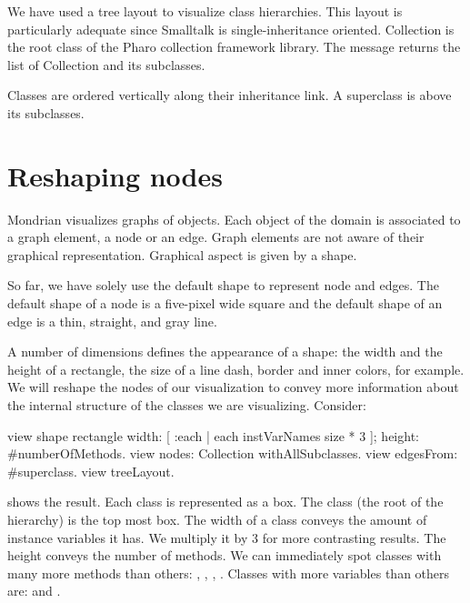 \documentclass[a4paper,10pt,twoside]{book}
\begin{document}
We have used a tree layout to visualize class hierarchies. This layout is particularly adequate since Smalltalk is single-inheritance oriented. Collection is the root class of the Pharo collection framework library. The message  returns the list of Collection and its subclasses.

Classes are ordered vertically along their inheritance link. A superclass is above its subclasses. 


\section{Reshaping nodes}

Mondrian visualizes graphs of objects. Each object of the domain is associated to a graph element, a node or an edge. Graph elements are not aware of their graphical representation. Graphical aspect is given by a shape. 

So far, we have solely use the default shape to represent node and edges. The default shape of a node is a five-pixel wide square and the default shape of an edge is a thin, straight, and gray line.

A number of dimensions defines the appearance of a shape: the width and the height of a rectangle, the size of a line dash, border and inner colors, for example. We will reshape the nodes of our visualization to convey more information about the internal structure of the classes we are visualizing. Consider:

\begin{code}{}
view shape rectangle
	width: [ :each | each instVarNames size * 3 ];
	height: #numberOfMethods.
view nodes: Collection withAllSubclasses.
view edgesFrom: #superclass.
view treeLayout.
\end{code}

 shows the result. Each class is represented as a box. The  class (the root of the hierarchy) is the top most box. The width of a class conveys the amount of instance variables it has. We multiply it by 3 for more contrasting results. The height conveys the number of methods. We can immediately spot classes with many more methods than others: , , , . Classes with more variables than others are:  and .
\end{document}
